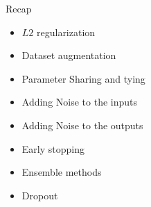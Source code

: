 \begin{frame}
	\vspace{4em}
	\begin{overlayarea}{\textwidth}{\textheight}
		\begin{block}{Recap}
			\begin{itemize}
				\item $L2$ regularization
				\item Dataset augmentation
				\item Parameter Sharing and tying
				\item Adding Noise to the inputs
				\item Adding Noise to the outputs 
				\item Early stopping
				\item Ensemble methods
				\item Dropout
			\end{itemize}
		\end{block}
	\end{overlayarea}
\end{frame}
				
